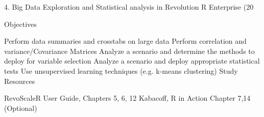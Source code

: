 4. Big Data Exploration and Statistical analysis in Revolution R Enterprise (20%

Objectives

Perform data summaries and crosstabs on large data
Perform correlation and variance/Covariance Matrices
Analyze a scenario and determine the methods to deploy for variable selection
Analyze a scenario and deploy appropriate statistical tests
Use unsupervised learning techniques (e.g. k-means clustering)
Study Resources

RevoScaleR User Guide, Chapters 5, 6, 12
Kabacoff, R in Action Chapter 7,14 (Optional)
